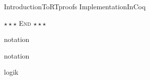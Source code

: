\documentclass[11pt, a4paper, twoside, bibliography=totoc]{scrartcl}
\begin{document}

	


\clearpage



\cleardoublepage


\cleardoublepage











{IntroductionToRTproofs}
{ImplementationInCoq}













\begin{center}
\mbox{}
\vfill
$\star \star \star$ \textsc{End} $\star \star \star$
\end{center}

\cleardoublepage
\appendix





{notation} %

{notation}

\cleardoublepage

{logik}
\end{document}
